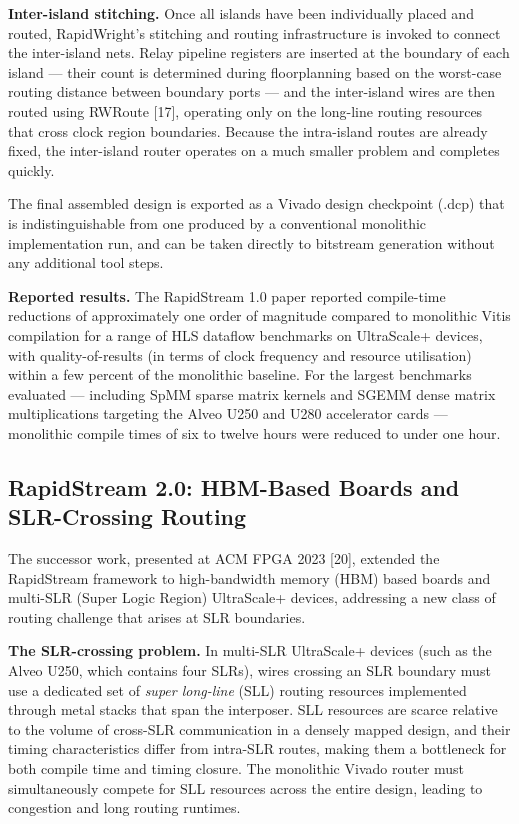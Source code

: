 \textbf{Inter-island stitching.} Once all islands have been individually placed and routed, RapidWright's stitching and routing infrastructure is invoked to connect the inter-island nets. Relay pipeline registers are inserted at the boundary of each island — their count is determined during floorplanning based on the worst-case routing distance between boundary ports — and the inter-island wires are then routed using RWRoute [17], operating only on the long-line routing resources that cross clock region boundaries. Because the intra-island routes are already fixed, the inter-island router operates on a much smaller problem and completes quickly.

The final assembled design is exported as a Vivado design checkpoint (.dcp) that is indistinguishable from one produced by a conventional monolithic implementation run, and can be taken directly to bitstream generation without any additional tool steps.

\textbf{Reported results.} The RapidStream 1.0 paper reported compile-time reductions of approximately one order of magnitude compared to monolithic Vitis compilation for a range of HLS dataflow benchmarks on UltraScale+ devices, with quality-of-results (in terms of clock frequency and resource utilisation) within a few percent of the monolithic baseline. For the largest benchmarks evaluated — including SpMM sparse matrix kernels and SGEMM dense matrix multiplications targeting the Alveo U250 and U280 accelerator cards — monolithic compile times of six to twelve hours were reduced to under one hour.

\subsection{RapidStream 2.0: HBM-Based Boards and SLR-Crossing Routing}

The successor work, presented at ACM FPGA 2023 [20], extended the RapidStream framework to high-bandwidth memory (HBM) based boards and multi-SLR (Super Logic Region) UltraScale+ devices, addressing a new class of routing challenge that arises at SLR boundaries.

\textbf{The SLR-crossing problem.} In multi-SLR UltraScale+ devices (such as the Alveo U250, which contains four SLRs), wires crossing an SLR boundary must use a dedicated set of \textit{super long-line} (SLL) routing resources implemented through metal stacks that span the interposer. SLL resources are scarce relative to the volume of cross-SLR communication in a densely mapped design, and their timing characteristics differ from intra-SLR routes, making them a bottleneck for both compile time and timing closure. The monolithic Vivado router must simultaneously compete for SLL resources across the entire design, leading to congestion and long routing runtimes.

